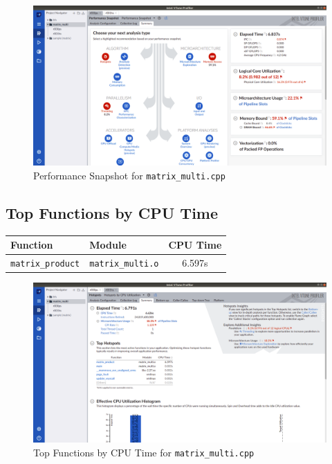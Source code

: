 \documentclass[11pt, swedish, openany]{book}
\begin{document}
\begin{figure}[H]
    \centering
    \includegraphics[scale=0.25]{vtune/matrix_multi/ps.png}
    \caption{Performance Snapshot for \texttt{matrix\_multi.cpp}}
\end{figure}

\newpage
\subsection*{Top Functions by CPU Time}
\begin{table}[H]
    \begin{tabular}{||l|l||c||}
        \hline
        Function                 & Module                   & CPU Time \\
        \hline
        \texttt{matrix\_product} & \texttt{matrix\_multi.o} & 6.597s   \\
        \hline
    \end{tabular}
\end{table}

\begin{figure}[H]
    \centering
    \includegraphics[scale=0.25]{vtune/matrix_multi/hs.png}
    \caption{Top Functions by CPU Time for \texttt{matrix\_multi.cpp}}
\end{figure}
\end{document}
